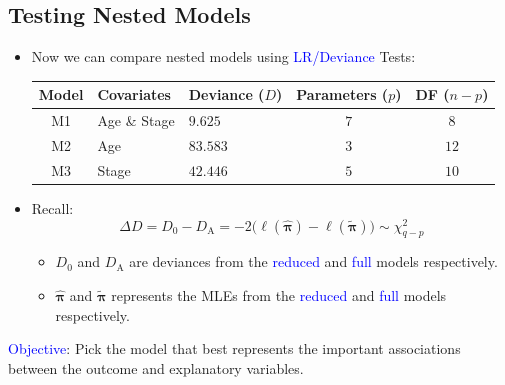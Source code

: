\documentclass[oneside]{book}\usepackage[]{graphicx}\usepackage[svgnames]{xcolor}
\providecommand{\Vector}[1]{\bm{#1}}%
\begin{document}
\subsection*{Testing Nested Models}
\begin{itemize}
    \item Now we can compare nested models using \textcolor{Blue}{LR/Deviance} Tests:
          \begin{table}[!htbp]
              \centering
              \begin{tabular}{cllcc}
                  \toprule
                  Model & Covariates   & Deviance ($ D $) & Parameters ($ p $) & DF ($ n-p $) \\
                  \midrule
                  M1    & Age \& Stage & $9.625$          & $ 7 $              & $ 8 $        \\
                  M2    & Age          & $83.583$         & $ 3 $              & $ 12 $       \\
                  M3    & Stage        & $42.446$         & $ 5 $              & $ 10 $       \\
                  \bottomrule
              \end{tabular}
          \end{table}
    \item Recall:
          \[ \Delta D=D_0-D_\text{A}=-2\bigl(\ell(\hat{\Vector{\pi}})-\ell(\tilde{\Vector{\pi}})\bigr) \sim \chi^2_{q-p} \]
          \begin{itemize}
              \item $ D_0 $ and $ D_\text{A} $ are deviances from the \textcolor{Blue}{reduced} and \textcolor{Blue}{full} models respectively.
              \item $ \hat{\Vector{\pi}} $ and $ \tilde{\Vector{\pi}} $ represents the MLEs from the \textcolor{Blue}{reduced} and \textcolor{Blue}{full} models respectively.
          \end{itemize}
\end{itemize}
\begin{Example}{}
    \textcolor{Blue}{Objective}: Pick the model that best represents the important associations between the
    outcome and explanatory variables.
\end{Example}
\end{document}
